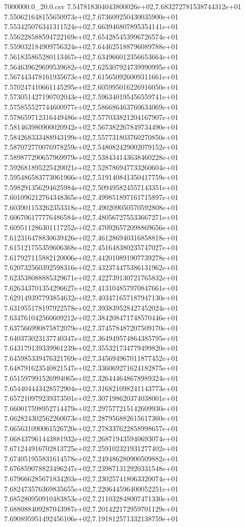 \begin{filecontents*}{7000000.0_20.0.csv}
7.547818304043800026e+02,7.683272781538744312e+01
7.550621648155650973e+02,7.673609250430035900e+01
7.553425076341311524e+02,7.663946807895354141e+01
7.556228588594722169e+02,7.654285453996726574e+01
7.559032184909756324e+02,7.644625188796089788e+01
7.561835865280113467e+02,7.634966012356653664e+01
7.564639629699539682e+02,7.625307924739990995e+01
7.567443478161935673e+02,7.615650926009311661e+01
7.570247410661145295e+02,7.605995016226916050e+01
7.573051427190702043e+02,7.596340195456559741e+01
7.575855527744600977e+02,7.586686463760634069e+01
7.578659712316449486e+02,7.577033821204167907e+01
7.581463980900020942e+02,7.567382267849734490e+01
7.584268333488943199e+02,7.557731803760270850e+01
7.587072770076978259e+02,7.548082429002079152e+01
7.589877290657969979e+02,7.538434143638460228e+01
7.592681895225420021e+02,7.528786947733260604e+01
7.595486583773061966e+02,7.519140841350417759e+01
7.598291356294625984e+02,7.509495824557143351e+01
7.601096212764348365e+02,7.499851897161715897e+01
7.603901153262353318e+02,7.490209050570592808e+01
7.606706177776486584e+02,7.480567275533667271e+01
7.609511286301117252e+02,7.470926572098869656e+01
7.612316478830639426e+02,7.461286940316858818e+01
7.615121755359606368e+02,7.451648380235747027e+01
7.617927115882120006e+02,7.442010891907739278e+01
7.620732560392598316e+02,7.432374475386131962e+01
7.623538088885329671e+02,7.422739130721765832e+01
7.626343701354296627e+02,7.413104857970847661e+01
7.629149397793854632e+02,7.403471657187947130e+01
7.631955178197922578e+02,7.393839528427452024e+01
7.634761042560609212e+02,7.384208471748570446e+01
7.637566990875872079e+02,7.374578487207509170e+01
7.640373023137740347e+02,7.364949574864385795e+01
7.643179139339961239e+02,7.355321734779499820e+01
7.645985339476321769e+02,7.345694967011877452e+01
7.648791623540821547e+02,7.336069271624182875e+01
7.651597991526994065e+02,7.326444648678989324e+01
7.654404443428572904e+02,7.316821098241143773e+01
7.657210979239373501e+02,7.307198620374038001e+01
7.660017598952714479e+02,7.297577215142609930e+01
7.662824302562260073e+02,7.287956882615617360e+01
7.665631090061526720e+02,7.278337622858998657e+01
7.668437961443881932e+02,7.268719435940693074e+01
7.671244916702813725e+02,7.259102321931277402e+01
7.674051955831614578e+02,7.249486280900509882e+01
7.676859078823496247e+02,7.239871312920331548e+01
7.679666285671834203e+02,7.230257418063320074e+01
7.682473576369835655e+02,7.220644596400052251e+01
7.685280950910483853e+02,7.211032848007471330e+01
7.688088409287043987e+02,7.201422172959701129e+01
7.690895951492456106e+02,7.191812571332138759e+01

\end{filecontents*}
